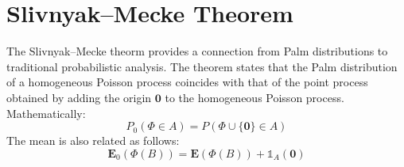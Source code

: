 \section{Slivnyak–Mecke Theorem}
%
The Slivnyak–Mecke theorm provides a connection from Palm distributions to traditional probabilistic analysis.  The theorem states that the Palm distribution of a homogeneous Poisson process coincides with that of the point process obtained by adding the origin $\textbf{0}$ to the homogeneous Poisson process. Mathematically:
%
\begin{equation}
  P_0(\Phi \in \textit{A}) = P(\Phi \cup \{ \textbf{0} \} \in \textit{A} )
\end{equation}
%
The mean is also related as follows:
%
\begin{equation}
  \textbf{E}_0 (\Phi(B)) = \textbf{E} (\Phi(B)) + \mathbb{1}_{\textit{A}} (\textbf{0})
\end{equation}
%
